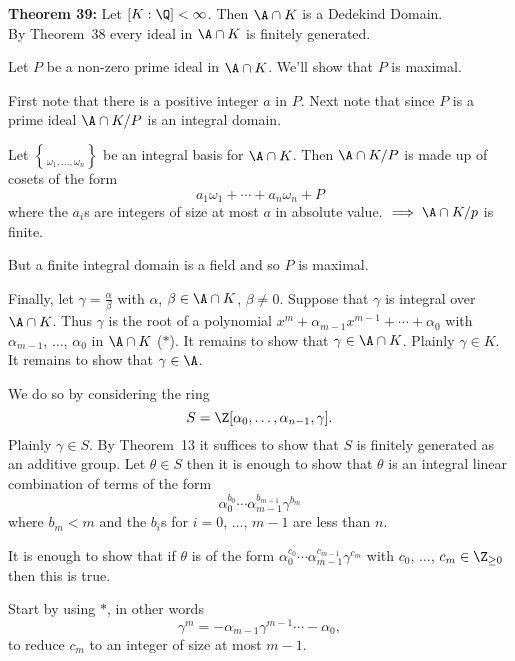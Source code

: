 \textbf{Theorem 39:} Let $[K:\Q]<\infty$.  Then $\A\cap K$ is a Dedekind Domain. \\
\pf By Theorem~38 every ideal in $\A\cap K$ is finitely generated.

Let $P$ be a non-zero prime ideal in $\A\cap K$.  We'll show that $P$ is maximal.

First note that there is a positive integer $a$ in $P$.  Next note that since $P$ is a prime ideal $\A\cap K/P$ is an integral domain.

Let $\brace{\omega_1,\dotsc,\omega_n}$ be an integral basis for $\A\cap K$.  Then $\A\cap K/P$ is made up of cosets of the form
\[ a_1\omega_1 + \dotsb + a_n\omega_n + P \]
where the $a_i$s are integers of size at most $a$ in absolute value. $\implies\A\cap K/p$ is finite.

But a finite integral domain is a field and so $P$ is maximal.

Finally, let $\gamma=\frac\alpha\beta$ with $\alpha$, $\beta\in\A\cap K$, $\beta\neq0$.  Suppose that $\gamma$ is integral over $\A\cap K$.  Thus $\gamma$ is the root of a polynomial $x^m+\alpha_{m-1}x^{m-1}+\dotsb+\alpha_0$ with $\alpha_{m-1}$, $\dotsc$, $\alpha_0$ in $\A\cap K$ ($*$).  It remains to show that $\gamma\in\A\cap K$.  Plainly $\gamma\in K$.  It remains to show that $\gamma\in\A$.

We do so by considering the ring
\[ S = \Z[\alpha_0,\dotsc,\alpha_{n-1},\gamma] . \]
Plainly $\gamma\in S$.  By Theorem~13 it suffices to show that $S$ %
is finitely generated as an additive group.  Let $\theta\in S$ then it is enough to show that $\theta$ is an integral linear combination of terms of the form
\[ \alpha_0^{b_0}\dotsm\alpha_{m-1}^{b_{m-1}}\gamma^{b_m} \]
where $b_m<m$ and the $b_i$s for $i=0$, $\dotsc$, $m-1$ are less than $n$.

It is enough to show that if $\theta$ is of the form $\alpha_0^{c_0}\dotsm\alpha_{m-1}^{c_{m-1}}\gamma^{c_m}$ with $c_0$, $\dotsc$, $c_m\in\Z_{\geq0}$ then this is true.

Start by using $*$, in other words
\[ \gamma^m = -\alpha_{m-1}\gamma^{m-1} \dotsb - \alpha_0 , \]
to reduce $c_m$ to an integer of size at most $m-1$.